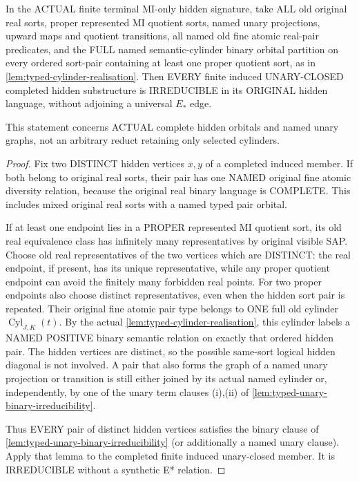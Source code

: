 \begin{lemma}
\label{lem:typed-terminal-hidden-irreducible}
In the ACTUAL finite
terminal MI-only hidden
signature, take ALL old
original real sorts,
proper represented
MI quotient sorts,
named unary projections,
upward maps and quotient
transitions, all named
old fine atomic
real-pair predicates,
and the FULL named
semantic-cylinder
binary orbital partition
on every ordered
sort-pair containing
at least one proper
quotient sort, as in
\cref{lem:typed-cylinder-realisation}.
Then EVERY finite induced
UNARY-CLOSED completed
hidden substructure is
IRREDUCIBLE in its
ORIGINAL hidden language,
without adjoining
a universal $E_*$ edge.

This statement concerns
ACTUAL complete hidden
orbitals and named unary
graphs, not an arbitrary
reduct retaining only
selected cylinders.
\end{lemma}
\begin{proof}
Fix two DISTINCT hidden
vertices $x,y$ of a
completed induced member.
If both belong to
original real sorts,
their pair has one
NAMED original fine
atomic diversity
relation, because
the original real
binary language is
COMPLETE. This includes
mixed original real sorts
with a named typed
pair orbital.

If at least one
endpoint lies in a
PROPER represented
MI quotient sort,
its old real
equivalence class
has infinitely many
representatives by
original visible SAP.
Choose old real
representatives of
the two vertices
which are DISTINCT:
the real endpoint,
if present, has its
unique representative,
while any proper
quotient endpoint
can avoid the finitely
many forbidden
real points. For
two proper endpoints
also choose distinct
representatives,
even when the hidden
sort pair is repeated.
Their original fine
atomic pair type
belongs to ONE full
old cylinder
\(\operatorname{Cyl}_{J,K}(t)\).
By the actual
\cref{lem:typed-cylinder-realisation},
this cylinder labels a
NAMED POSITIVE
binary semantic relation
on exactly that ordered
hidden pair.
The hidden vertices
are distinct, so
the possible same-sort
logical hidden diagonal
is not involved.
A pair that also
forms the graph of a
named unary projection
or transition is still
either joined by its
actual named cylinder
or, independently,
by one of the unary
term clauses (i),(ii)
of
\cref{lem:typed-unary-binary-irreducibility}.

Thus EVERY pair of
distinct hidden
vertices satisfies
the binary clause of
\cref{lem:typed-unary-binary-irreducibility}
(or additionally a
named unary clause).
Apply that lemma to
the completed finite
induced unary-closed
member. It is
IRREDUCIBLE without
a synthetic E* relation.
\end{proof}

